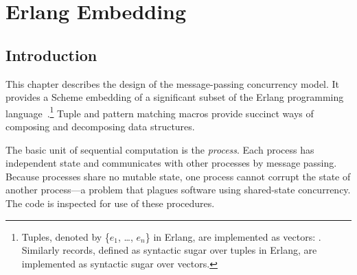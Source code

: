 %
%
%

\chapter {Erlang Embedding}\label{chap:erlang}

\section {Introduction}

This chapter describes the design of the message-passing concurrency
model. It provides a Scheme embedding of a significant subset of the
Erlang programming
language~\cite{armstrong-thesis,programming-erlang}.\footnote{Tuples,
  denoted by \{$e_1$, \ldots, $e_n$\} in Erlang, are implemented as
  vectors: . Similarly
  records, defined as syntactic sugar over tuples in Erlang, are
  implemented as syntactic sugar over vectors.}  Tuple and pattern
matching macros provide succinct ways of composing and decomposing
data structures.

The basic unit of sequential computation is the \emph{process}.  Each
process has independent state and communicates with other processes by
message passing. Because processes share no mutable state, one process
cannot corrupt the state of another process---a problem that plagues
software using shared-state concurrency.  \mitigation The code is
inspected for use of these procedures.

